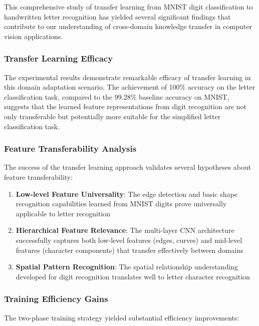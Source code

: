 \documentclass[12pt,a4paper]{article}
\begin{document}
This comprehensive study of transfer learning from MNIST digit classification to handwritten letter recognition has yielded several significant findings that contribute to our understanding of cross-domain knowledge transfer in computer vision applications.

\subsubsection{Transfer Learning Efficacy}

The experimental results demonstrate remarkable efficacy of transfer learning in this domain adaptation scenario. The achievement of 100\% accuracy on the letter classification task, compared to the 99.28\% baseline accuracy on MNIST, suggests that the learned feature representations from digit recognition are not only transferable but potentially more suitable for the simplified letter classification task.

\subsubsection{Feature Transferability Analysis}

The success of the transfer learning approach validates several hypotheses about feature transferability:

\begin{enumerate}
    \item \textbf{Low-level Feature Universality}: The edge detection and basic shape recognition capabilities learned from MNIST digits prove universally applicable to letter recognition
    \item \textbf{Hierarchical Feature Relevance}: The multi-layer CNN architecture successfully captures both low-level features (edges, curves) and mid-level features (character components) that transfer effectively between domains
    \item \textbf{Spatial Pattern Recognition}: The spatial relationship understanding developed for digit recognition translates well to letter character recognition
\end{enumerate}

\subsubsection{Training Efficiency Gains}

The two-phase training strategy yielded substantial efficiency improvements:
\end{document}
